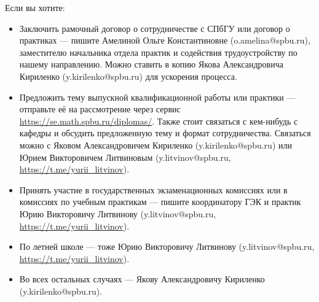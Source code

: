 \documentclass[a5paper]{article}
\begin{document}
Если вы хотите:

\begin{itemize}
    \item Заключить рамочный договор о сотрудничестве с СПбГУ или договор о практиках --- пишите Амелиной Ольге Константиновне (o.amelina@spbu.ru), заместителю начальника отдела практик и содействия трудоустройству по нашему направлению. Можно ставить в копию Якова Александровича Кириленко (y.kirilenko@spbu.ru) для ускорения процесса.
    \item Предложить тему выпускной квалификационной работы или практики --- отправьте её на рассмотрение через сервис \url{https://se.math.spbu.ru/diplomas/}. Также стоит связаться с кем-нибудь с кафедры и обсудить предложенную тему и формат сотрудничества. Связаться можно с Яковом Александровичем Кириленко (y.kirilenko@spbu.ru) или Юрием Викторовичем Литвиновым (y.litvinov@spbu.ru, \url{https://t.me/yurii_litvinov}).
    \item Принять участие в государственных экзаменационных комиссиях или в комиссиях по учебным практикам --- пишите координатору ГЭК и практик Юрию Викторовичу Литвинову (y.litvinov@spbu.ru, \url{https://t.me/yurii_litvinov}).
    \item По летней школе --- тоже Юрию Викторовичу Литвинову (y.litvinov@spbu.ru, \url{https://t.me/yurii_litvinov}).
    \item Во всех остальных случаях --- Якову Александровичу Кириленко (y.kirilenko@spbu.ru).
\end{itemize}
\end{document}

